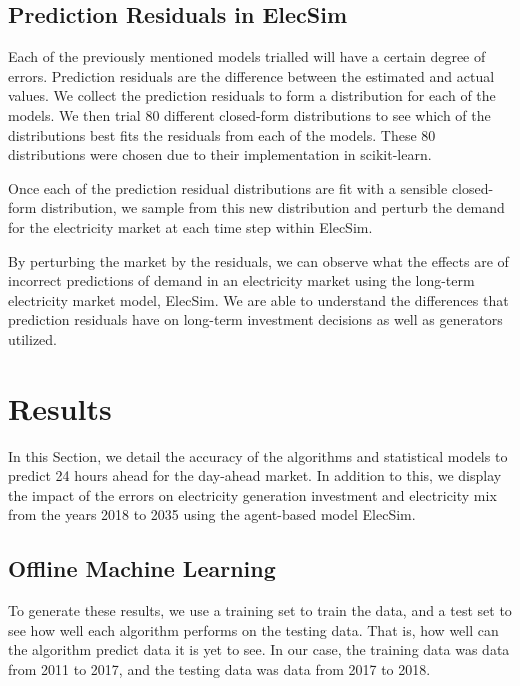 \documentclass[final,3p,times,twocolumn,numbers]{elsarticle}
\begin{document}
\subsection{Prediction Residuals in ElecSim}

Each of the previously mentioned models trialled will have a certain degree of errors. Prediction residuals are the difference between the estimated and actual values. We collect the prediction residuals to form a distribution for each of the models. We then trial 80 different closed-form distributions to see which of the distributions best fits the residuals from each of the models. These 80 distributions were chosen due to their implementation in scikit-learn.

Once each of the prediction residual distributions are fit with a sensible closed-form distribution, we sample from this new distribution and perturb the demand for the electricity market at each time step within ElecSim.

By perturbing the market by the residuals, we can observe what the effects are of incorrect predictions of demand in an electricity market using the long-term electricity market model, ElecSim. We are able to understand the differences that prediction residuals have on long-term investment decisions as well as generators utilized.




\section{Results}
\label{sec:results}

In this Section, we detail the accuracy of the algorithms and statistical models to predict 24 hours ahead for the day-ahead market. In addition to this, we display the impact of the errors on electricity generation investment and electricity mix from the years 2018 to 2035 using the agent-based model ElecSim.



\subsection{Offline Machine Learning}

To generate these results, we use a training set to train the data, and a test set to see how well each algorithm performs on the testing data. That is, how well can the algorithm predict data it is yet to see. In our case, the training data was data from 2011 to 2017, and the testing data was data from 2017 to 2018.
\end{document}
